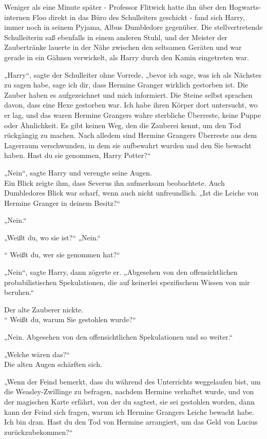 {Weniger als eine Minute später - Professor Flitwick hatte ihn über den Hogwarts-internen Floo direkt in das Büro des Schulleiters geschickt - fand sich Harry, immer noch in seinem Pyjama, Albus Dumbledore gegenüber. Die stellvertretende Schulleiterin saß ebenfalls in einem anderen Stuhl, und der Meister der Zaubertränke lauerte in der Nähe zwischen den seltsamen Geräten und war gerade in ein Gähnen verwickelt, als Harry durch den Kamin eingetreten war.

„Harry“, sagte der Schulleiter ohne Vorrede, „bevor ich sage, was ich als Nächstes zu sagen habe, sage ich dir, dass Hermine Granger wirklich gestorben ist. Die Zauber haben es aufgezeichnet und mich informiert. Die Steine selbst sprachen davon, dass eine Hexe gestorben war. Ich habe ihren Körper dort untersucht, wo er lag, und das waren Hermine Grangers wahre sterbliche Überreste, keine Puppe oder Ähnlichkeit. Es gibt keinen Weg, den die Zauberei kennt, um den Tod rückgängig zu machen. Nach alledem sind Hermine Grangers Überreste aus dem Lagerraum verschwunden, in dem sie aufbewahrt wurden und den Sie bewacht haben. Hast du sie genommen, Harry Potter?“

„Nein“, sagte Harry und verengte seine Augen.\\ Ein Blick zeigte ihm, dass Severus ihn aufmerksam beobachtete. Auch Dumbledores Blick war scharf, wenn auch nicht unfreundlich. „Ist die Leiche von Hermine Granger in deinem Besitz?“

„Nein.“

„Weißt du, wo sie ist?“ „Nein.“

“ Weißt du, wer sie genommen hat?“

„Nein“, sagte Harry, dann zögerte er. „Abgesehen von den offensichtlichen probabilistischen Spekulationen, die auf keinerlei spezifischem Wissen von mir beruhen.“

Der alte Zauberer nickte.\\ “ Weißt du, warum Sie gestohlen wurde?“

„Nein. Abgesehen von den offensichtlichen Spekulationen und so weiter.“

„Welche wären das?“\\ Die alten Augen schärften sich.

„Wenn der Feind bemerkt, dass du während des Unterrichts weggelaufen bist, um die Weasley-Zwillinge zu befragen, nachdem Hermine verhaftet wurde, und von der magischen Karte erfährt, von der du sagtest, sie sei gestohlen worden, dann kann der Feind sich fragen, warum ich Hermine Grangers Leiche bewacht habe. Ich bin dran. Hast du den Tod von Hermine arrangiert, um das Geld von Lucius zurückzubekommen?“

}
